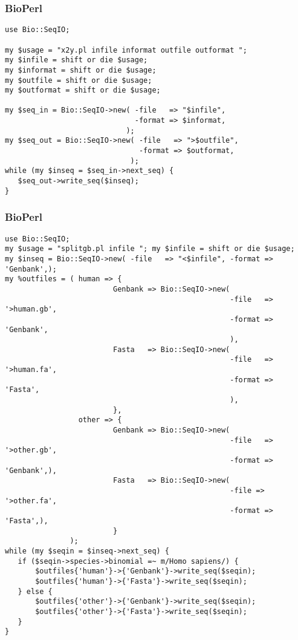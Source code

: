 \begin{frame}[fragile]
  \frametitle{BioPerl}
\begin{lstlisting}[basicstyle=\footnotesize\tt,numberstyle=\scriptsize]
use Bio::SeqIO;

my $usage = "x2y.pl infile informat outfile outformat "; 
my $infile = shift or die $usage; 
my $informat = shift or die $usage; 
my $outfile = shift or die $usage; 
my $outformat = shift or die $usage;

my $seq_in = Bio::SeqIO->new( -file   => "$infile",
                              -format => $informat,
                            );
my $seq_out = Bio::SeqIO->new( -file   => ">$outfile",
                               -format => $outformat,
                             );
while (my $inseq = $seq_in->next_seq) {
   $seq_out->write_seq($inseq);
}
\end{lstlisting}
\end{frame}

\begin{frame}[fragile]
  \frametitle{BioPerl}
\begin{lstlisting}[basicstyle=\tiny\tt,numberstyle=\tiny]
use Bio::SeqIO;
my $usage = "splitgb.pl infile "; my $infile = shift or die $usage;
my $inseq = Bio::SeqIO->new( -file   => "<$infile", -format => 'Genbank',);
my %outfiles = ( human => {
                         Genbank => Bio::SeqIO->new(
                                                    -file   => '>human.gb',
                                                    -format => 'Genbank',
                                                    ),
                         Fasta   => Bio::SeqIO->new(
                                                    -file   => '>human.fa',
                                                    -format => 'Fasta',
                                                    ),
                         },
                 other => {
                         Genbank => Bio::SeqIO->new(
                                                    -file   => '>other.gb',
                                                    -format => 'Genbank',),
                         Fasta   => Bio::SeqIO->new(
                                                    -file => '>other.fa',
                                                    -format => 'Fasta',),
                         }
               );
while (my $seqin = $inseq->next_seq) {
   if ($seqin->species->binomial =~ m/Homo sapiens/) {
       $outfiles{'human'}->{'Genbank'}->write_seq($seqin);
       $outfiles{'human'}->{'Fasta'}->write_seq($seqin);
   } else {
       $outfiles{'other'}->{'Genbank'}->write_seq($seqin);
       $outfiles{'other'}->{'Fasta'}->write_seq($seqin);
   }
}
\end{lstlisting}
\end{frame}

